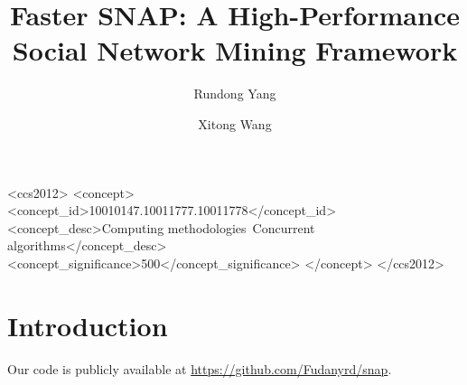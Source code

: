 \documentclass[acmlarge]{acmart}
\begin{document}
\title{Faster SNAP: A High-Performance Social Network Mining Framework}

\author{Rundong Yang}
\author{Xitong Wang}
\authornotemark[1]




\begin{CCSXML}
<ccs2012>
   <concept>
       <concept_id>10010147.10011777.10011778</concept_id>
       <concept_desc>Computing methodologies~Concurrent algorithms</concept_desc>
       <concept_significance>500</concept_significance>
       </concept>
 </ccs2012>
\end{CCSXML}





\maketitle

\section{Introduction}
\par Our code is publicly available at \url{https://github.com/Fudanyrd/snap}.









\end{document}
